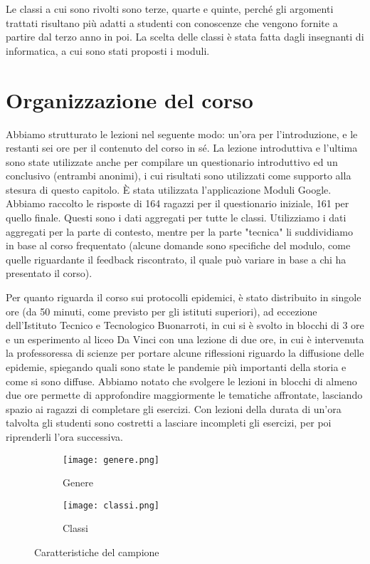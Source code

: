 Le classi a cui sono rivolti sono terze, quarte e quinte, perché gli argomenti trattati risultano più adatti a studenti con conoscenze che vengono fornite a partire dal terzo anno in poi. La scelta delle classi è stata fatta dagli insegnanti di informatica, a cui sono stati proposti i moduli.


\section{Organizzazione del corso}
Abbiamo strutturato le lezioni nel seguente modo: un’ora per l’introduzione, e le restanti sei ore per il contenuto del corso in sé. La lezione introduttiva e l’ultima sono state utilizzate anche per compilare un questionario introduttivo ed un conclusivo (entrambi anonimi), i cui risultati sono utilizzati come supporto alla stesura di questo capitolo. È stata utilizzata l’applicazione Moduli Google. Abbiamo raccolto le risposte di 164 ragazzi per il questionario iniziale, 161 per quello finale. Questi sono i dati aggregati per tutte le classi. Utilizziamo i dati aggregati per la parte  di contesto, mentre per la parte "tecnica" li suddividiamo in base al corso frequentato (alcune domande sono specifiche del modulo, come quelle riguardante il feedback riscontrato, il quale può variare in base a chi ha presentato il corso). 

Per quanto riguarda il corso sui protocolli epidemici, è stato distribuito in singole ore (da 50 minuti, come previsto per gli istituti superiori), ad eccezione dell'Istituto Tecnico e Tecnologico Buonarroti, in cui si è svolto in blocchi di 3 ore e un esperimento al liceo Da Vinci con una lezione di due ore, in cui è intervenuta la professoressa di scienze per portare alcune riflessioni riguardo la diffusione delle epidemie, spiegando quali sono state le pandemie più importanti della storia e come si sono diffuse. Abbiamo notato che svolgere le lezioni in blocchi di almeno due ore permette di approfondire maggiormente le tematiche affrontate, lasciando spazio ai ragazzi di completare gli esercizi. Con lezioni della durata di un'ora talvolta gli studenti sono costretti a lasciare incompleti gli esercizi, per poi riprenderli l'ora successiva. 

\begin{figure}[!ht]
    \begin{subfigure}{.5\textwidth}
        \centering
        \texttt{[image: genere.png]}
        \caption{Genere}
        \label{fig:genere}
    \end{subfigure}\hfill
    \begin{subfigure}{.5\textwidth}
        \centering
        \texttt{[image: classi.png]}
        \caption{Classi}
        \label{fig:classi}
    \end{subfigure}
    \caption{Caratteristiche del campione} 
\end{figure}
